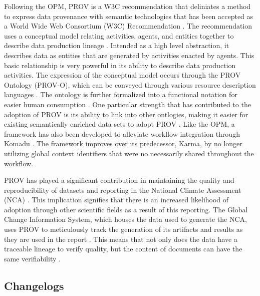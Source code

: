 Following the OPM, PROV is a W3C recommendation that deliniates a method to express data provenance with semantic technologies that has been accepted as a World Wide Web Consortium (W3C) Recommendation \cite{Belhajjame2013} \cite{Belhajjame2013c} \cite{Groth2013}.
The recommendation uses a conceptual model relating activities, agents, and entities together to describe data production lineage \cite{Belhajjame2013a} \cite{Nies2013} \cite{Missier2013}.
Intended as a high level abstraction, it describes data as entities that are generated by activities enacted by agents.
This basic relationship is very powerful in its ability to describe data production activities.
The expression of the conceptual model occurs through the PROV Ontology (PROV-O), which can be conveyed through various resource description languages \cite{Belhajjame2013b} \cite{Moreau2013a} \cite{Moreau2013b}.
The ontology is further formalized into a functional notation for easier human consumption \cite{Cheney2013} \cite{Cheney2013a}.
One particular strength that has contributed to the adoption of PROV is its ability to link into other ontlogies, making it easier for existing semantically enriched data sets to adopt PROV \cite{Miles2013} \cite{Moreau2013}.
Like the OPM, a framework has also been developed to alleviate workflow integration through Komadu \cite{Suriarachchi_2015}.
The framework improves over its predecessor, Karma, by no longer utilizing global context identifiers that were no necessarily shared throughout the workflow.

PROV has played a significant contribution in maintaining the quality and reproducibility of datasets and reporting in the National Climate Assessment (NCA) \cite{Ma2014191}.
This implication signifies that there is an increased likelihood of adoption through other scientific fields as a result of this reporting.
The Global Change Information System, which houses the data used to generate the NCA, uses PROV to meticulously track the generation of its artifacts and results as they are used in the report \cite{Tilmes2012}.
This means that not only does the data have a traceable lineage to verify quality, but the content of documents can have the same verifiability \cite{Ma2014}. 

\subsection{Changelogs}

